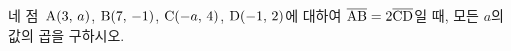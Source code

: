 네 점~$\mathrm{A}(3,\,a)$, $\mathrm{B}(7,\,-1)$, $\mathrm{C}(-a,\,4)$, $\mathrm{D}(-1,\,2)$에 대하여 $\overline{\mathrm{AB}}=2\overline{\mathrm{CD}}$일 때, 모든 $a$의 값의 곱을 구하시오.
